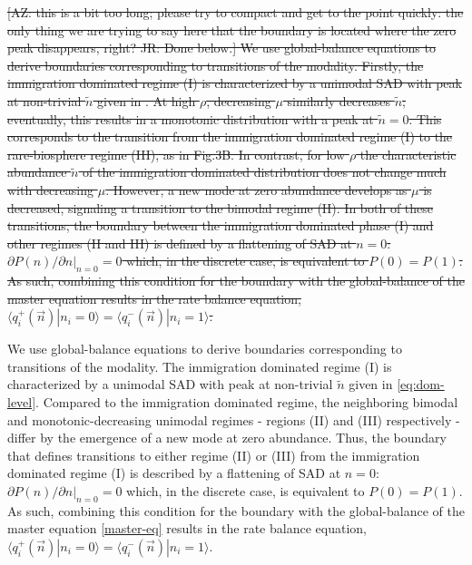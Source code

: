 \documentclass[9pt,twocolumn,twoside,lineno]{pnas-new}
\begin{document}
\st{[AZ: this is a bit too long; please try to compact and get to the point quickly: the only thing we are trying to say here that the boundary is located where the zero peak disappears, right? JR: Done below.] We use global-balance equations to derive boundaries corresponding to transitions of the modality.
Firstly, the immigration dominated regime (I) is characterized by a unimodal SAD with peak at non-trivial $\tilde{n}$ given in .
At high $\rho$, decreasing $\mu$ similarly decreases $\tilde{n}$; eventually, this results in a monotonic distribution with a peak at $\tilde{n} = 0$.
This corresponds to the transition from the immigration dominated regime (I) to the rare-biosphere regime (III), as in Fig.3B.
In contrast, for low $\rho$ the characteristic abundance $\tilde{n}$ of the immigration dominated distribution does not change much with decreasing $\mu$.
However, a new mode at zero abundance develops as $\mu$ is decreased, signaling a transition to the bimodal regime (II). 
In both of these transitions, the boundary between the immigration dominated phase (I) and other regimes (II and III) is defined by a flattening of SAD at $n=0$: $\partial P(n)/ \partial n|_{n=0} = 0$ which, in the discrete case, is equivalent to $P(0)=P(1)$.
As such, combining this condition for the boundary with the global-balance of the master equation  results in the rate balance equation,
$\langle q_i^+(\vec{n})|n_i=0 \rangle=\langle q_i^-(\vec{n})|n_i=1 \rangle$.}

We use global-balance equations to derive boundaries corresponding to transitions of the modality.
The immigration dominated regime (I) is characterized by a unimodal SAD with peak at non-trivial $\tilde{n}$ given in \eqref{eq:dom-level}.
Compared to the immigration dominated regime, the neighboring bimodal and monotonic-decreasing unimodal regimes - regions (II) and (III) respectively - differ by the emergence of a new mode at zero abundance. 
Thus, the boundary that defines transitions to either regime (II) or (III) from the immigration dominated regime (I) is described by a flattening of SAD at $n=0$: $\partial P(n)/ \partial n|_{n=0} = 0$ which, in the discrete case, is equivalent to $P(0)=P(1)$.
As such, combining this condition for the boundary with the global-balance of the master equation \eqref{master-eq} results in the rate balance equation,
$\langle q_i^+(\vec{n})|n_i=0 \rangle=\langle q_i^-(\vec{n})|n_i=1 \rangle$.
\end{document}
